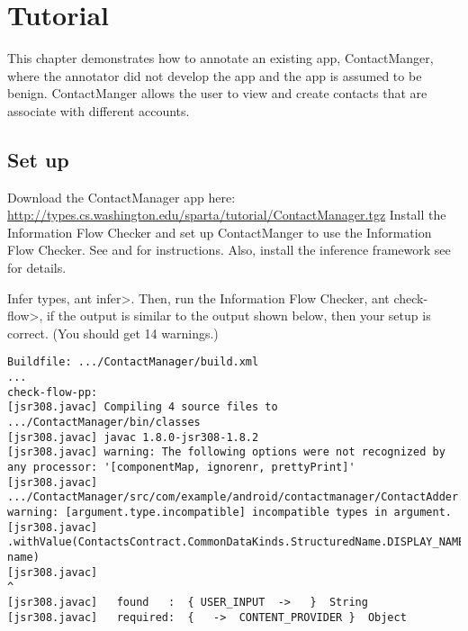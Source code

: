 \htmlhr


\newcommand{\method}[1]{\paragraph{#1}}
\newcommand{\annomethod}[1]{\small{\texttt{#1}}\newline}
\chapter{Tutorial\label{tutorial}}

This chapter demonstrates how to annotate an existing app, ContactManger,
 where the annotator did not develop the app and the app is assumed to be benign.
   ContactManger allows the user to view and create contacts that are associate 
   with different accounts.  


\section{Set up}
Download the ContactManager app here: \url{http://types.cs.washington.edu/sparta/tutorial/ContactManager.tgz}
Install the Information Flow Checker and set up ContactManger to use the Information Flow Checker. 
See   and  for instructions. Also, install the inference framework
see \secref{} for details.

Infer types, \<ant infer>.
Then, run the Information Flow Checker, \<ant check-flow>, if the output is similar to 
the output shown below, then your setup is correct.  (You should get 14 warnings.)

\begin{Verbatim}
Buildfile: .../ContactManager/build.xml
...
check-flow-pp:
[jsr308.javac] Compiling 4 source files to .../ContactManager/bin/classes
[jsr308.javac] javac 1.8.0-jsr308-1.8.2
[jsr308.javac] warning: The following options were not recognized by any processor: '[componentMap, ignorenr, prettyPrint]'
[jsr308.javac] .../ContactManager/src/com/example/android/contactmanager/ContactAdder.java:195: warning: [argument.type.incompatible] incompatible types in argument.
[jsr308.javac]                 .withValue(ContactsContract.CommonDataKinds.StructuredName.DISPLAY_NAME, name)
[jsr308.javac]                                                                                          ^
[jsr308.javac]   found   :  { USER_INPUT  ->   }  String
[jsr308.javac]   required:  {   ->  CONTENT_PROVIDER }  Object
\end{Verbatim} 

